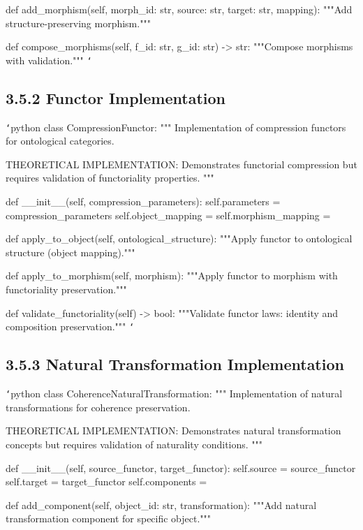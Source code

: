     def add_morphism(self, morph_id: str, source: str, target: str, mapping):
        """Add structure-preserving morphism."""
        
    def compose_morphisms(self, f_id: str, g_id: str) -> str:
        """Compose morphisms with validation."""
\texttt{`}

\subsection{3.5.2 Functor Implementation}

\texttt{`}python
class CompressionFunctor:
    """
    Implementation of compression functors for ontological categories.
    
    THEORETICAL IMPLEMENTATION: Demonstrates functorial compression
    but requires validation of functoriality properties.
    """
    
    def __init__(self, compression_parameters):
        self.parameters = compression_parameters
        self.object_mapping = {}
        self.morphism_mapping = {}
        
    def apply_to_object(self, ontological_structure):
        """Apply functor to ontological structure (object mapping)."""
        
    def apply_to_morphism(self, morphism):
        """Apply functor to morphism with functoriality preservation."""
        
    def validate_functoriality(self) -> bool:
        """Validate functor laws: identity and composition preservation."""
\texttt{`}

\subsection{3.5.3 Natural Transformation Implementation}

\texttt{`}python
class CoherenceNaturalTransformation:
    """
    Implementation of natural transformations for coherence preservation.
    
    THEORETICAL IMPLEMENTATION: Demonstrates natural transformation
    concepts but requires validation of naturality conditions.
    """
    
    def __init__(self, source_functor, target_functor):
        self.source = source_functor
        self.target = target_functor
        self.components = {}
        
    def add_component(self, object_id: str, transformation):
        """Add natural transformation component for specific object."""
        
